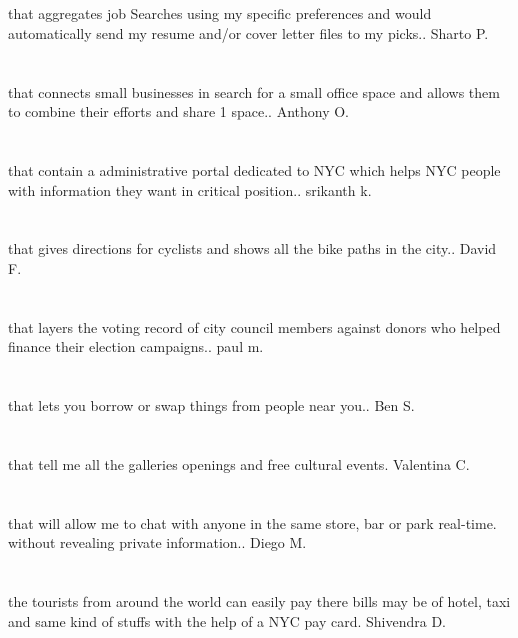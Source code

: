 \section{}that aggregates job Searches using my specific preferences and would automatically send my resume and/or cover letter files to my picks.. Sharto P.
\section{}that connects small businesses in search for a small office space and allows them to combine their efforts and share 1 space.. Anthony O.
\section{}that contain a administrative portal dedicated to NYC which helps NYC people with information they want in critical position.. srikanth k.
\section{}that gives directions for cyclists and shows all the bike paths in the city.. David F.
\section{}that layers the voting record of city council members against donors who helped finance their election campaigns.. paul m.
\section{}that lets you borrow or swap things from people near you.. Ben S.
\section{}that tell me all the galleries openings and free cultural events. Valentina C.
\section{}that will allow me to chat with anyone in the same store,  bar or park real-time. without revealing private information.. Diego M.
\section{}the tourists from around the world can easily pay there bills may be of hotel,  taxi and same kind of stuffs with the help of a NYC pay card. Shivendra D.

